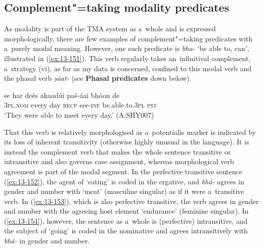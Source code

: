 \subsection{Complement"=taking modality predicates}
\label{subsec:13-5-2}

 As modality is part of the TMA system as a~whole and is expressed morphologically, there are few examples of complement"=taking predicates with a~purely modal meaning. However, one such predicate is \textit{bha-} `be able to, can', illustrated in (\ref{ex:13-151}). This verb regularly takes an~infinitival complement, a~strategy (vi), as far as my data is concerned, confined to this modal verb and the phasal verb \textit{ṣáat-} (see \textbf{Phasal predicates} down below).

\begin{exe}
\ex
\label{ex:13-151}
\gll se har deés akaadúi paš-áai bhóon de  \\
\textsc{3pl.nom} every day \textsc{recp} see-\textsc{inf} be.able.to.\textsc{3pl} \textsc{pst} \\
\glt `They were able to meet every day.' (A:SHY007) 
\end{exe}

That this verb is relatively morphologised as a~potentialis marker is indicated by its loss of inherent transitivity (otherwise highly unusual in the language). It is instead the complement verb that makes the whole sentence transitive or intransitive and also governs case assignment, whereas morphological verb agreement is part of the modal segment. In the perfective transitive sentence (\ref{ex:13-152}), the agent of `eating' is coded in the ergative, and \textit{bhá-} agrees in gender and number with `meat' (masculine singular) as if it were a~transitive verb. In (\ref{ex:13-153}), which is also perfective transitive, the verb agrees in gender and number with the agreeing host element `endurance' (feminine singular). In (\ref{ex:13-154}), however, the sentence as a~whole is (perfective) intransitive, and the subject of `going' is coded in the nominative and agrees intransitively with \textit{bhá-} in gender and number.

